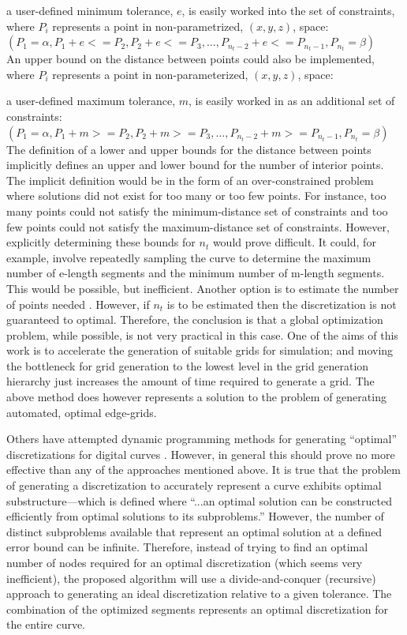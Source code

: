 a user-defined minimum tolerance, $e$, is easily worked into the set of constraints, where $P_i$ represents a point in non-parametrized, $(x,y,z)$, space: \\
$(P_1 = \alpha, P_1+e <= P_2, P_2+e <= P_3, … , P_{n_t-2}+ e <= P_{n_t-1}, P_{n_t} = \beta)$ \\

\noindent An upper bound on the distance between points could also be implemented, where $P_i$ represents a point in non-parameterized, $(x,y,z)$, space:

a user-defined maximum tolerance, $m$, is easily worked in as an additional set of constraints: \\
$(P_1 = \alpha, P_1+m >= P_2, P_2+m >= P_3, … , P_{n_t-2}+ m >= P_{n_t-1}, P_{n_t} = \beta)$ \\

\noindent The definition of a lower and upper bounds for the distance between points implicitly defines an upper and lower bound for the number of interior points.  The implicit definition would be in the form of an over-constrained problem where solutions did not exist for too many or too few points.  For instance, too many points could not satisfy the minimum-distance set of constraints and too few points could not satisfy the maximum-distance set of constraints.  However, explicitly determining these bounds for $n_t$ would prove difficult.  It could, for example, involve repeatedly sampling the curve to determine the maximum number of e-length segments and the minimum number of m-length segments.  This would be possible, but inefficient.  Another option is to estimate the number of points needed \cite{cuilliere97}.  However, if $n_t$ is to be estimated then the discretization is not guaranteed to optimal. Therefore, the conclusion is that a global optimization problem, while possible, is not very practical in this case.  One of the aims of this work is to accelerate the generation of suitable grids for simulation; and moving the bottleneck for grid generation to the lowest level in the grid generation hierarchy just increases the amount of time required to generate a grid.  The above method does however represents a solution to the problem of generating automated, optimal edge-grids.

Others have attempted dynamic programming methods for generating ``optimal'' discretizations for digital curves \cite{horng02}.  However, in general this should prove no more effective than any of the approaches mentioned above.  It is true that the problem of generating a discretization to accurately represent a curve exhibits optimal substructure—which is defined where ``...an optimal solution can be constructed efficiently from optimal solutions to its subproblems.'' \cite{cormen01}  However, the number of distinct subproblems available that represent an optimal solution at a defined error bound can be infinite.  Therefore, instead of trying to find an optimal number of nodes required for an optimal discretization (which seems very inefficient), the proposed algorithm will use a divide-and-conquer (recursive) approach to generating an ideal discretization relative to a given tolerance.  The combination of the optimized segments represents an optimal discretization for the entire curve.

